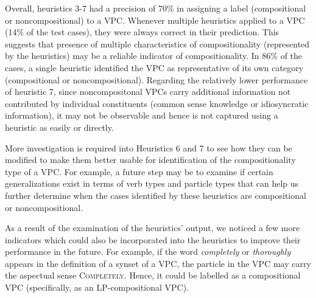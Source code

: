 \documentclass[output=paper
,modfonts
,nonflat]{langsci/langscibook}
\begin{document}
\begin{table}
\caption[Evaluation of heuristics 3-7 using Test Set 1 (50 test cases)]{Evaluation of heuristics 3-7 using Test Set 1 (50 test cases)\footnote{We define precision as Cn/Tn and coverage as Tn/N, where N is the corpus size, Tn is the sample size that heuristic n is applicable to, and Cn is the number of correct assignments it makes.}}
\label{tab:1:eval-heur}
\vspace*{-2mm}
\end{table}


Overall, heuristics 3-7 had a precision of $70\%$ in assigning a label (compositional or noncompositional) to a VPC. Whenever multiple heuristics applied to a VPC (14\% of the test cases), they were always correct in their prediction. This suggests that presence of multiple characteristics of compositionality (represented by the heuristics) may be a reliable indicator of compositionality. In 86\% of the cases, a single heuristic identified the VPC as representative of its own category (compositional or noncompositional). Regarding the relatively lower performance of heuristic 7, since noncompositonal VPCs carry additional information not contributed by individual constituents (common sense knowledge or idiosyncratic information), it may not be observable and hence is not captured using a heuristic as easily or directly.

More investigation is required into Heuristics 6 and 7 to see how they can be modified to make them better usable for identification of the compositionality type of a VPC. For example, a future step may be to examine if certain generalizations exist in terms of verb types and particle types that can help us further determine when the cases identified by these heuristics are compositional or noncompositional.

As a result of the examination of the heuristics' output, we noticed a few more indicators which could also be incorporated into the heuristics to %
improve their performance in the future. For example, if the word \textit{completely} or \textit{thoroughly} appears in the definition of a synset of a VPC, the particle in the VPC may carry the aspectual sense \textsc{Completely}. Hence, it could be labelled as a compositional VPC (specifically, as an LP-compositional VPC).
\end{document}
